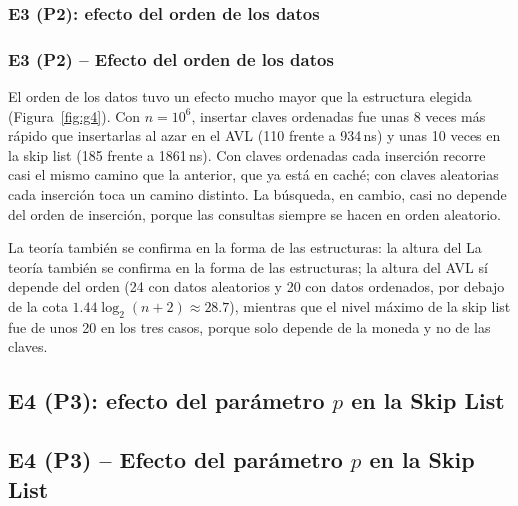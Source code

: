 \documentclass[11pt,a4paper]{article}
\begin{document}
\subsubsection*{E3 (P2): efecto del orden de los datos}
\subsubsection*{E3 (P2) -- Efecto del orden de los datos}

El orden de los datos tuvo un efecto mucho mayor que la estructura elegida
(Figura~\ref{fig:g4}). Con $n=10^6$, insertar claves ordenadas fue unas 8
veces más rápido que insertarlas al azar en el AVL (110 frente a 934\,ns) y
unas 10 veces en la skip list (185 frente a 1861\,ns). Con claves ordenadas
cada inserción recorre casi el mismo camino que la anterior, que ya está en
caché; con claves aleatorias cada inserción toca un camino distinto. La
búsqueda, en cambio, casi no depende del orden de inserción, porque las
consultas siempre se hacen en orden aleatorio.

La teoría también se confirma en la forma de las estructuras: la altura del
La teoría también se confirma en la forma de las estructuras; la altura del
AVL sí depende del orden (24 con datos aleatorios y 20 con datos ordenados,
por debajo de la cota $1.44\log_2(n+2)\approx 28.7$), mientras que el nivel
máximo de la skip list fue de unos 20 en los tres casos, porque solo depende
de la moneda y no de las claves.

\subsection{E4 (P3): efecto del parámetro \texorpdfstring{$p$}{p} en la Skip List}\label{sec:e4}\label{sec:p3}
\subsection{E4 (P3) -- Efecto del parámetro \texorpdfstring{$p$}{p} en la Skip List}\label{sec:e4}\label{sec:p3}
\end{document}
